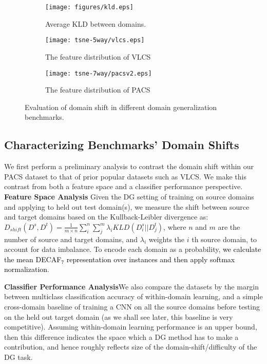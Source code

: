 \documentclass[10pt,twocolumn,letterpaper]{article}
\begin{document}
\begin{figure*}[t]
\centering
\begin{subfigure}{0.14\textwidth}
\centering
\vspace{1cm}
\texttt{[image: figures/kld.eps]}
\caption{Average KLD between domains.}
\end{subfigure}
\hspace{0.6cm}
\begin{subfigure}{0.32\textwidth}
\centering
\texttt{[image: tsne-5way/vlcs.eps]}
\caption{The feature distribution of VLCS}
\end{subfigure}
\hspace{-0.2cm}
\begin{subfigure}{0.32\textwidth}
\centering
\texttt{[image: tsne-7way/pacsv2.eps]}
\caption{The feature distribution of PACS}
\end{subfigure}
\caption{Evaluation of domain shift in different domain generalization benchmarks.}\label{fig:domain-bias}
\end{figure*}

\subsection{Characterizing Benchmarks' Domain  Shifts}\label{sub:datasetAnalysis}
We first perform a preliminary analysis to contrast the domain shift within our PACS dataset to that of prior popular datasets such as VLCS. We make this contrast from both a feature space and a classifier performance perspective.\\
\noindent\textbf{Feature Space Analysis}\quad
Given the DG setting of training on source domains and applying to held out test domain(s), we measure the shift between source and target domains based on the Kullback-Leibler divergence as: $D_{shift}(D^{s}, D^{t})= \frac{1}{m\times n} \sum\limits_i^n\sum\limits_j^m \lambda_{i} KLD(D_{i}^{s}||D_{j}^{t})$,
where $n$ and $m$ are the number of source and target domains, and $\lambda_{i}$ weights the $i$ th source domain, to account for data imbalance. To encode each domain as a probability, \textcolor{black}{we calculate the mean DECAF$_7$ representation over instances and then apply softmax normalization}. 

\vspace{0.1cm}\noindent\textbf{Classifier Performance Analysis}\quad We also compare the datasets by the margin between multiclass classification accuracy of within-domain learning, and a simple cross-domain baseline of training a CNN on all the source domains before testing on the held out target domain (as we shall see later, this baseline is very competitive). Assuming within-domain learning performance is an upper bound, then this difference indicates the space which a DG method has to make a contribution, and hence roughly reflects size of the domain-shift/difficulty of the DG task. 
\end{document}

